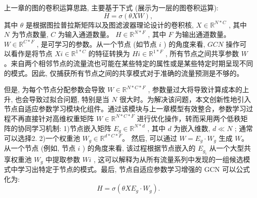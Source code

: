 上一章的图的卷积运算思路, 主要基于下式 (展示为一层的图卷积运算):
\begin{equation}
H = \sigma \left( {\theta XW}\right), 
\end{equation}
其中 \(\theta\) 是根据图拉普拉斯矩阵以及图滤波器理论设计的卷积核, \({X} \in  {\mathbb{R}}^{{N} * {C}}\) , 其中 \({N}\) 为节点数量, \({C}\) 为输入通道数量。 \({H} \in  {\mathbb{R}}^{{N} * {F}}\) , 其中 \({F}\) 为输出通道数量。 \({W} \in  {\mathbb{R}}^{{C} * {F}}\) , 是可学习的参数。从一个节点 (如节点 \({i}\) ) 的角度来看, \({{GCN}}\) 操作可以看作是将节点 \({{Xi}} \in  {\mathbb{R}}^{1 * {C}}\) 的特征转换为 \({{Hi}} \in  {\mathbb{R}}^{1 * {F}}\) , 所有节点之间共享参数 \({W}\)。来自两个相邻节点的流量流也可能在某些特定的属性或是某些特定时期呈现不同的模式。因此, 仅捕获所有节点之间的共享模式对于准确的流量预测是不够的。

但是, 为每个节点分配参数会导致 \({W} \in  {\mathbb{R}}^{{N} * {C} * {F}}\) , 参数量过大将导致计算成本的上升, 也会导致过拟合问题, 特别是当 \({N}\) 很大时。为解决该问题，本文创新性地引入节点自适应参数学习模块化组件。通过该模块与上一章模型有效整合，参数学习过程不再直接针对高维权重矩阵 \({W} \in {\mathbb{R}}^{{N} * {C} * {F}}\) 进行优化操作，转而采用两个低秩矩阵的协同学习机制: 1)节点嵌入矩阵 \({{E}}_{{g}} \in  {\mathbb{R}}^{{N} * {d}}\) , 其中 \({d}\) 为嵌入维数, \({d} \ll  {N}\) ; 通常可以选择2. 2)一个权重池 \({{W}}_{{g}} \in  {\mathbb{R}}^{{d} * {C} * {F}}\)。 然后, 可以通过 \({W} = {{E}}_{{g}} \cdot  {{W}}_{{g}}\) 生成 \({W}\)。从一个节点 (例如, 节点 \({i}\) ) 的角度来看, 该过程根据节点嵌入的 \({{E}}_{{{g}}_{i}}\) 从一个大型共享权重池 \({{W}}_{{g}}\) 中提取参数 \({{Wi}}\) , 这可以解释为从所有流量系列中发现的一组候选模式中学习出特定于节点的模式。最后, 节点自适应参数学习增强的 GCN 可以公式化为:
\begin{equation}
H = \sigma \left( {{\theta X}{{E}}_{{g}} \cdot  {{W}}_{{g}}}\right).
\end{equation}


